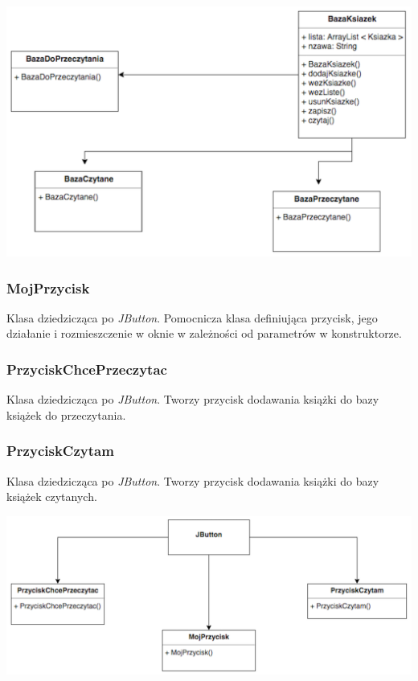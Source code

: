 \documentclass[a4paper,10pt]{article}
\begin{document}
\begin{enumerate}
\begin{center}
\includegraphics[scale=0.18]{UML2.png}
\end{center}

\subsubsection{MojPrzycisk}
Klasa dziedzicząca po \textit{JButton}. Pomocnicza klasa definiująca przycisk, jego działanie i rozmieszczenie w oknie w zależności od parametrów w konstruktorze.

\subsubsection{PrzyciskChcePrzeczytac}
Klasa dziedzicząca po \textit{JButton}. Tworzy przycisk dodawania książki do bazy książek do przeczytania.

\subsubsection{PrzyciskCzytam}
Klasa dziedzicząca po \textit{JButton}. Tworzy przycisk dodawania książki do bazy książek czytanych.

\begin{center}
\includegraphics[scale=0.18]{UML7.png}
\end{center}


\end{enumerate}
\end{document}
